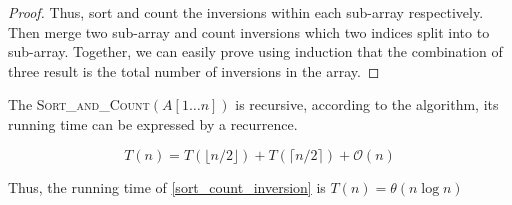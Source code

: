 \begin{homeworkProblem}[Inversions]
\begin{proof}
    Thus, sort and count the inversions within each sub-array respectively. Then merge two
    sub-array and count inversions which two indices split into to sub-array.
    Together, we can easily prove using induction that the combination of
    three result is the total number of inversions in the array.
\end{proof}

The \textsc{Sort\_and\_Count}$(A[1 \ldots n])$ is recursive, according to the algorithm,
its running time can be expressed by a recurrence.

\begin{equation}
    T(n) = T(\lfloor n/2 \rfloor) + T(\lceil n/2 \rceil) + \mathcal{O}(n)
\end{equation}

Thus, the running time of \cref{sort_count_inversion} is $T(n) = \theta(n \log n)$

\end{homeworkProblem}
